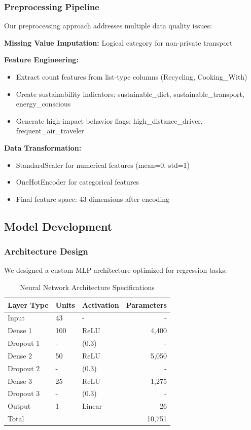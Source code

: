 \documentclass[12pt,a4paper]{article}
\begin{document}
\subsubsection{Preprocessing Pipeline}

Our preprocessing approach addresses multiple data quality issues:

\textbf{Missing Value Imputation:}
Logical category for non-private transport

\textbf{Feature Engineering:}
\begin{itemize}
    \item Extract count features from list-type columns (Recycling, Cooking\_With)
    \item Create sustainability indicators: sustainable\_diet, sustainable\_transport, energy\_conscious
    \item Generate high-impact behavior flags: high\_distance\_driver, frequent\_air\_traveler
\end{itemize}

\textbf{Data Transformation:}
\begin{itemize}
    \item StandardScaler for numerical features (mean=0, std=1)
    \item OneHotEncoder for categorical features
    \item Final feature space: 43 dimensions after encoding
\end{itemize}

\subsection{Model Development}

\subsubsection{Architecture Design}

We designed a custom MLP architecture optimized for regression tasks:

\begin{table}[H]
\centering
\caption{Neural Network Architecture Specifications}
\begin{tabular}{@{}lllr@{}}
\toprule
Layer Type & Units & Activation & Parameters \\
\midrule
Input & 43 & - & - \\
Dense 1 & 100 & ReLU & 4,400 \\
Dropout 1 & - & (0.3) & - \\
Dense 2 & 50 & ReLU & 5,050 \\
Dropout 2 & - & (0.3) & - \\
Dense 3 & 25 & ReLU & 1,275 \\
Dropout 3 & - & (0.3) & - \\
Output & 1 & Linear & 26 \\
\midrule
Total & & & 10,751 \\
\bottomrule
\end{tabular}
\end{table}
\end{document}
